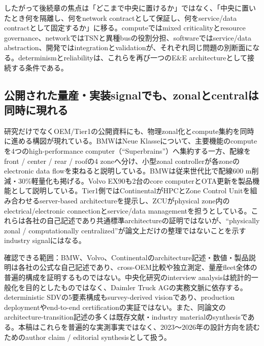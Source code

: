 \begin{surveyarticlebody}
したがって後続章の焦点は「どこまで中央に置けるか」ではなく、「中央に置いたとき何を隔離し、何をnetwork contractとして保証し、何をservice/data contractとして固定するか」に移る。computeではmixed criticalityとresource governance、networkではTSNと異種busの役割分担、softwareではservice/data abstraction、開発ではintegrationとvalidationが、それぞれ同じ問題の別断面になる。determinismとreliabilityは、これらを再び一つのE\&E architectureとして接続する条件である。\autocite{src-e34d32d330e6}

\subsection{公開された量産・実装signalでも、zonalとcentralは同時に現れる}
研究だけでなくOEM/Tier1の公開資料にも、物理zonal化とcompute集約を同時に進める構図が現れている。BMWはNeue Klasseについて、主要機能のcomputeを4つのhigh-performance computer（``Superbrains''）へ集約する一方、配線をfront / center / rear / roofの4 zoneへ分け、小型zonal controllerが各zoneのelectronic data flowを束ねると説明している。BMWは従来世代比で配線600 m削減・30\%軽量化も掲げる。Volvo EX90も2台のcore computerとOTA更新を製品機能として説明している。Tier1側ではContinentalがHPCとZone Control Unitを組み合わせるserver-based architectureを提示し、ZCUがphysical zone内のelectrical/electronic connectionとservice/data managementを担うとしている。これらは各社の自己記述であり共通標準architectureの証明ではないが、``physically zonal / computationally centralized''が論文上だけの整理ではないことを示すindustry signalにはなる。\autocite{src-1096d739982f,src-725f5d05634d,src-e08dbef62089}
\end{surveyarticlebody}

\begin{claimboundary}
確認できる範囲：BMW、Volvo、Continentalのarchitecture記述・数値・製品説明は各社の公式な自己記述であり、cross-OEM比較や独立測定、量産fleet全体の普遍的構成を証明するものではない。中央化研究のinterview analysisは統計的一般化を目的としたものではなく、Daimler Truck AGの実務文脈に依存する。deterministic SDVの5要素構成もsurvey-derived visionであり、production deploymentやend-to-end certificationの実証ではない。また、同論文のarchitecture-transition記述の多くは既存文献・industry materialのsynthesisである。本稿はこれらを普遍的な実測事実ではなく、2023〜2026年の設計方向を読むためのauthor claim / editorial synthesisとして扱う。\autocite{src-d5d5a7ec3f4c,src-e34d32d330e6}
\end{claimboundary}

